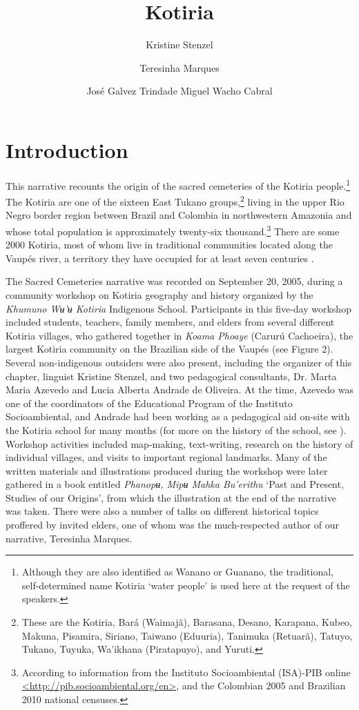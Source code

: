 \documentclass[output=paper,
modfonts,nonflat
]{langsci/langscibook}
\author{Kristine Stenzel\affiliation{Federal University of Rio de Janeiro, Brazil}\and%
Teresinha Marques\and%
José Galvez Trindade%
\lastand Miguel Wacho Cabral%
}%
\title{Kotiria}
\begin{document}
\section{Introduction} 

This narrative recounts the origin of the sacred cemeteries of the Kotiria people.\footnote{Although they are also identified as Wanano or Guanano, the traditional, self-determined name Kotiria ‘water people’ is used here at the request of the speakers.}  The Kotiria are one of the sixteen East Tukano groups,\footnote{These are the Kotiria, Bará (Waimajã), Barasana, Desano, Karapana, Kubeo, Makuna, Pisamira, Siriano, Taiwano (Eduuria), Tanimuka (Retuarã), Tatuyo, Tukano, Tuyuka, Wa’ikhana (Piratapuyo), and Yuruti.} living in the upper Rio Negro border region between Brazil and Colombia in northwestern Amazonia and whose total population is approximately twenty-six thousand.\footnote{According to information from the Instituto Socioambiental (ISA)-PIB online \url{<http://pib.socioambiental.org/en>}, and the Colombian 2005 and Brazilian 2010 national censuses.} There are some 2000 Kotiria, most of whom live in traditional communities located along the Vaupés river, a territory they have occupied for at least seven centuries \parencite[10]{Stenzel2013}. 

The Sacred Cemeteries narrative was recorded on September 20, 2005, during a community workshop on Kotiria geography and history organized by the \textit{Khumuno Wʉ’ʉ Kotiria} Indigenous School. Participants in this five-day workshop included students, teachers, family members, and elders from several different Kotiria villages, who gathered together in \textit{Koama Phoaye} (Carurú Cachoeira), the largest Kotiria community on the Brazilian side of the Vaupés (see Figure 2). Several non-indigenous outsiders were also present, including the organizer of this chapter, linguist Kristine Stenzel, and two pedagogical consultants, Dr. Marta Maria Azevedo and Lucia Alberta Andrade de Oliveira. At the time, Azevedo was one of the coordinators of the Educational Program of the Instituto Socioambiental, and Andrade had been working as a pedagogical aid on-site with the Kotiria school for many months (for more on the history of the school, see \cite{Oliveira2012}). Workshop activities included map-making, text-writing, research on the history of individual villages, and visits to important regional landmarks. Many of the written materials and illustrations produced during the workshop were later gathered in a book entitled \textit{Phanopʉ, Mipʉ Mahka Bu’erithu} ‘Past and Present, Studies of our Origins’, from which the illustration at the end of the narrative was taken. There were also a number of talks on different historical topics proffered by invited elders, one of whom was the much-respected author of our narrative, Teresinha Marques.
\end{document}
